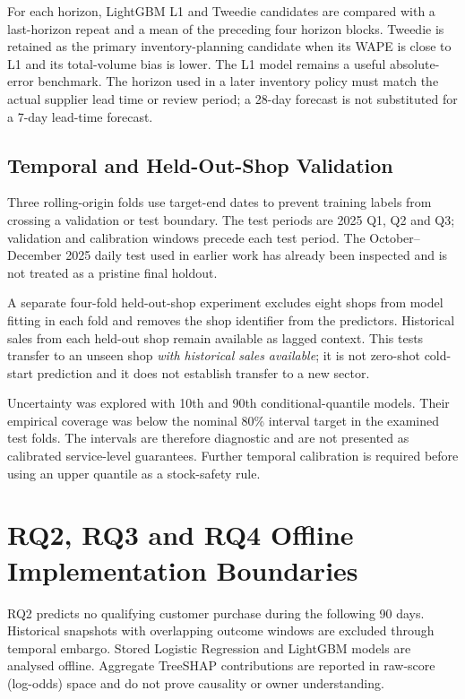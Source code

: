 For each horizon, LightGBM L1 and Tweedie candidates are compared with a last-horizon repeat and a mean of the preceding four horizon blocks. Tweedie is retained as the primary inventory-planning candidate when its WAPE is close to L1 and its total-volume bias is lower. The L1 model remains a useful absolute-error benchmark. The horizon used in a later inventory policy must match the actual supplier lead time or review period; a 28-day forecast is not substituted for a 7-day lead-time forecast.

\subsection{Temporal and Held-Out-Shop Validation}

Three rolling-origin folds use target-end dates to prevent training labels from crossing a validation or test boundary. The test periods are 2025 Q1, Q2 and Q3; validation and calibration windows precede each test period. The October--December 2025 daily test used in earlier work has already been inspected and is not treated as a pristine final holdout.

A separate four-fold held-out-shop experiment excludes eight shops from model fitting in each fold and removes the shop identifier from the predictors. Historical sales from each held-out shop remain available as lagged context. This tests transfer to an unseen shop \emph{with historical sales available}; it is not zero-shot cold-start prediction and it does not establish transfer to a new sector.

Uncertainty was explored with 10th and 90th conditional-quantile models. Their empirical coverage was below the nominal 80\% interval target in the examined test folds. The intervals are therefore diagnostic and are not presented as calibrated service-level guarantees. Further temporal calibration is required before using an upper quantile as a stock-safety rule.

\section{RQ2, RQ3 and RQ4 Offline Implementation Boundaries}

RQ2 predicts no qualifying customer purchase during the following 90 days. Historical snapshots with overlapping outcome windows are excluded through temporal embargo. Stored Logistic Regression and LightGBM models are analysed offline. Aggregate TreeSHAP contributions are reported in raw-score (log-odds) space and do not prove causality or owner understanding.

